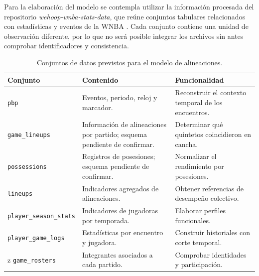 Para la elaboración del modelo se contempla utilizar la información procesada del repositorio \textit{wehoop-wnba-stats-data}, que reúne conjuntos tabulares relacionados con estadísticas y eventos de la WNBA \cite{wehoopRepositorio}. Cada conjunto contiene una unidad de observación diferente, por lo que no será posible integrar los archivos sin antes comprobar identificadores y consistencia.

\begin{table}[htbp]
\centering
\small
\renewcommand{\arraystretch}{1.18}
\caption{Conjuntos de datos previstos para el modelo de alineaciones.}
\label{tab:fuentes_wehoop}
\begin{tabularx}{\textwidth}{@{}p{3.2cm}XX@{}}
\toprule
\textbf{Conjunto} & \textbf{Contenido} & \textbf{Funcionalidad}\\
\midrule
\texttt{pbp} & Eventos, periodo, reloj y marcador. & Reconstruir el contexto temporal de los encuentros.\\
\texttt{game\_lineups} & Información de alineaciones por partido; esquema pendiente de confirmar. & Determinar qué quintetos coincidieron en cancha.\\
\texttt{possessions} & Registros de posesiones; esquema pendiente de confirmar. & Normalizar el rendimiento por posesiones.\\
\texttt{lineups} & Indicadores agregados de alineaciones. & Obtener referencias de desempeño colectivo.\\
\texttt{player\_season\_stats} & Indicadores de jugadoras por temporada. & Elaborar perfiles funcionales.\\
\texttt{player\_game\_logs} & Estadísticas por encuentro y jugadora. & Construir historiales con corte temporal.\\z
\texttt{game\_rosters} & Integrantes asociados a cada partido. & Comprobar identidades y participación.\\
\bottomrule
\end{tabularx}
\end{table}

